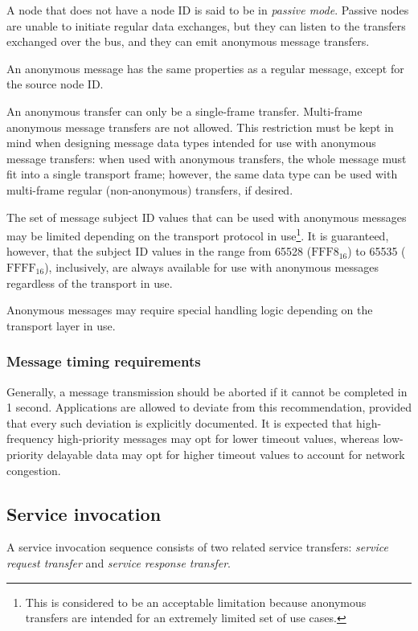 A node that does not have a node ID is said to be in \emph{passive mode}.
Passive nodes are unable to initiate regular data exchanges,
but they can listen to the transfers exchanged over the bus,
and they can emit anonymous message transfers.

An anonymous message has the same properties as a regular message, except for the source node ID.

An anonymous transfer can only be a single-frame transfer. Multi-frame anonymous message transfers are not allowed.
This restriction must be kept in mind when designing message data types
intended for use with anonymous message transfers:
when used with anonymous transfers, the whole message must fit into a single transport frame;
however, the same data type can be used with multi-frame regular (non-anonymous) transfers, if desired.

The set of message subject ID values that can be used with anonymous messages may be limited
depending on the transport protocol in use\footnote{This is considered to be an acceptable limitation because
anonymous transfers are intended for an extremely limited set of use cases.}.
It is guaranteed, however, that the subject ID values in the range
from 65528 ($\text{FFF8}_\text{16}$) to 65535 ($\text{FFFF}_\text{16}$), inclusively,
are always available for use with anonymous messages regardless of the transport in use.

Anonymous messages may require special handling logic depending on the transport layer in use.

\subsubsection{Message timing requirements}

Generally, a message transmission should be aborted if it cannot be completed in 1 second.
Applications are allowed to deviate from this recommendation,
provided that every such deviation is explicitly documented.
It is expected that high-frequency high-priority messages may opt for lower timeout values,
whereas low-priority delayable data may opt for higher timeout values to account for network congestion.

\subsection{Service invocation}

A service invocation sequence consists of two related service transfers:
\emph{service request transfer} and \emph{service response transfer}.

